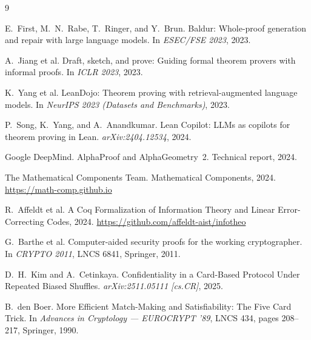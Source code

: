 \documentclass[11pt,a4paper]{article}
\begin{document}
\begingroup\footnotesize
\begin{thebibliography}{9}
\setlength{\itemsep}{0pt}\setlength{\parsep}{0pt}\setlength{\parskip}{0pt}

E.~First, M.~N.~Rabe, T.~Ringer, and Y.~Brun. Baldur: Whole-proof generation and
repair with large language models. In \textit{ESEC/FSE 2023}, 2023.

A.~Jiang et al. Draft, sketch, and prove: Guiding formal theorem provers with
informal proofs. In \textit{ICLR 2023}, 2023.

K.~Yang et al. LeanDojo: Theorem proving with retrieval-augmented language
models. In \textit{NeurIPS 2023 (Datasets and Benchmarks)}, 2023.

P.~Song, K.~Yang, and A.~Anandkumar. Lean Copilot: LLMs as copilots for theorem
proving in Lean.
\textit{arXiv:2404.12534}, 2024.

Google DeepMind. AlphaProof and AlphaGeometry~2. Technical report, 2024.

The Mathematical Components Team. Mathematical Components, 2024.
\url{https://math-comp.github.io}

R.~Affeldt et al. A Coq Formalization of Information Theory and Linear
Error-Correcting Codes, 2024.
\url{https://github.com/affeldt-aist/infotheo}

G.~Barthe et al. Computer-aided security proofs for the working cryptographer.
In \textit{CRYPTO 2011}, LNCS 6841, Springer, 2011.

D.~H.~Kim and A.~Cetinkaya. Confidentiality in a Card-Based Protocol Under
Repeated Biased Shuffles.
\textit{arXiv:2511.05111 [cs.CR]}, 2025.

B.~den Boer. More Efficient Match-Making and Satisfiability: The Five Card
Trick. In \textit{Advances in Cryptology --- EUROCRYPT '89}, LNCS 434, pages
208--217, Springer, 1990.

\end{thebibliography}
\endgroup
\end{document}
